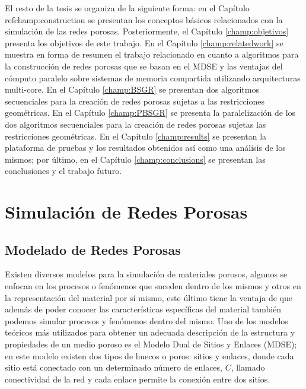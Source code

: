 
El resto de la tesis se organiza de la siguiente forma:  en el Capítulo ref{champ:construction} se presentan los conceptos básicos relacionados con la simulación de las redes porosas. Posteriormente, el Capítulo \ref{champ:objetivos} presenta los objetivos de este trabajo. En el Capítulo \ref{champ:relatedwork} se muestra en forma de resumen el trabajo relacionado en cuanto a algoritmos para la construcción de redes porosas que se basan en el MDSE y las ventajas del cómputo paralelo sobre sistemas de memoria compartida utilizando arquitecturas multi-core. En el Capítulo \ref{champ:BSGR} se presentan dos algoritmos secuenciales para la creación de redes porosas sujetas a las restricciones geométricas. En el Capítulo \ref{champ:PBSGR} se presenta la paralelización de los dos algoritmos secuenciales para la creación de redes porosas sujetas las restricciones geométricas. En el Capítulo \ref{champ:results} se presentan la plataforma de pruebas y los resultados obtenidos así como una análisis de los mismos; por último, en el Capítulo \ref{champ:conclusions} se presentan las conclusiones y el trabajo futuro.


\chapter{Simulación de Redes Porosas}
\label{champ:construction}
\bigskip
\barra
\bigskip


\section{Modelado de Redes Porosas}
\label{sec:model}
Existen diversos modelos para la simulación de materiales porosos, algunos se enfocan en los procesos o fenómenos que suceden dentro de los mismos y otros en la representación del material por sí mismo, este último tiene la ventaja de que además de poder conocer las características específicas del material también podemos simular procesos y fenómenos dentro del mismo. Uno de los modelos teóricos más utilizados para obtener un adecuada descripción de la estructura y propiedades de un medio poroso es el Modelo Dual de Sitios y Enlaces (MDSE)\cite{ref1}\cite{ref2}; en este modelo existen dos tipos de huecos o poros: sitios y enlaces, donde cada sitio está conectado con un determinado número de enlaces, $C$, llamado conectividad de la red y cada enlace permite la conexión entre dos sitios.\\

